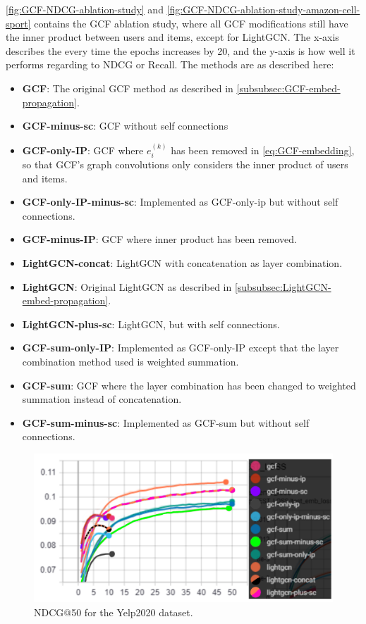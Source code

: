 \autoref{fig:GCF-NDCG-ablation-study} and \autoref{fig:GCF-NDCG-ablation-study-amazon-cell-sport} contains the GCF ablation study, where all GCF modifications still have the inner product between users and items, except for LightGCN.
The x-axis describes the every time the epochs increases by 20, and the y-axis is how well it performs regarding to NDCG or Recall.
The methods are as described here:\\
\begin{itemize}
    \item \textbf{GCF}: The original GCF method as described in \autoref{subsubsec:GCF-embed-propagation}.
    \item \textbf{GCF-minus-sc}: GCF without self connections
    \item \textbf{GCF-only-IP}:  GCF where $e_i^{(k)}$ has been removed in \autoref{eq:GCF-embedding}, so that GCF's graph convolutions only considers the inner product of users and items.
    \item \textbf{GCF-only-IP-minus-sc}: Implemented as GCF-only-ip but without self connections.
    \item \textbf{GCF-minus-IP}: GCF where inner product has been removed.
    \item \textbf{LightGCN-concat}: LightGCN with concatenation as layer combination.
    \item \textbf{LightGCN}: Original LightGCN as described in \autoref{subsubsec:LightGCN-embed-propagation}.
    \item \textbf{LightGCN-plus-sc}: LightGCN, but with self connections.
    \item \textbf{GCF-sum-only-IP}: Implemented as GCF-only-IP except that the layer combination method used is weighted summation.
    \item \textbf{GCF-sum}: GCF where the layer combination has been changed to weighted summation instead of concatenation.
    \item \textbf{GCF-sum-minus-sc}: Implemented as GCF-sum but without self connections.
\end{itemize}
\begin{figure}[h!]
    \includegraphics[width=\linewidth]{figures/gcf-all-ndcg.png}
    \caption{NDCG@50 for the Yelp2020 dataset.}
    \label{fig:GCF-NDCG-ablation-study}
\end{figure}
